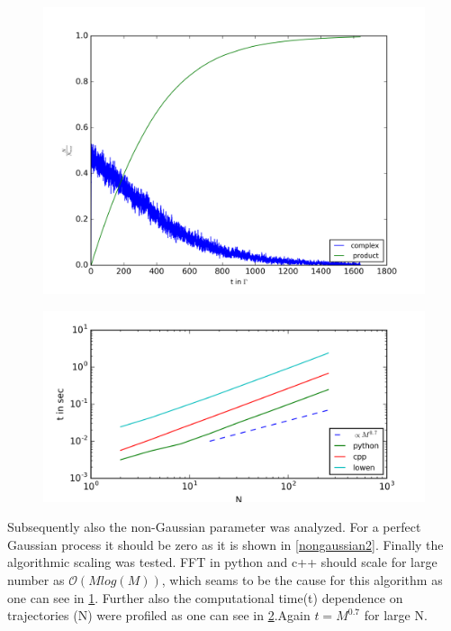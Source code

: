 \documentclass[
  a4paper,BCOR10mm,oneside,
  bibtotoc,idxtotoc,
  headsepline,footsepline,%
  fleqn,openbib
]{scrbook}
\begin{document}
\begin{figure}[h]
  \centering
  \includegraphics[width=\linewidth]{./data/profiling_length.png}
  \captionsetup{width=0.9\linewidth}
  \label{fig:1}
\end{figure}
\begin{figure}[h!]
  \centering
  \includegraphics[width=\linewidth]{./data/profiling_particle.png}
  \captionsetup{width=0.9\linewidth}
  \label{fig:2}
\end{figure}
\noindent Subsequently also the non-Gaussian parameter was analyzed. For a perfect Gaussian process it should be zero as it is shown in \cref{nongaussian2}. \newline
Finally the algorithmic scaling was tested. FFT in python and c++ should scale for large number as  $\mathcal{O}(M log(M))$, which seams to be the cause for this algorithm as one can see in \cref{fig:1}. Further also the computational time(t) dependence on trajectories (N) were profiled as one can see in \cref{fig:2}.Again $t = M^{0.7}$ for large N.  
\end{document}
